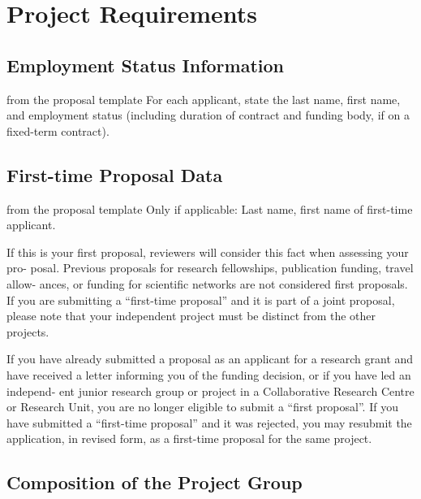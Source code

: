 \section{Project Requirements}\label{sec:requirements}

\subsection{Employment Status Information}\label{sec:req:employment-status}

\begin{todo}{from the proposal template}
  For each applicant, state the last name, first name, and employment status (including
  duration of contract and funding body, if on a fixed-term contract).
\end{todo}

\subsection{First-time Proposal Data}\label{sec:req:first}

\begin{todo}{from the proposal template}
  Only if applicable: Last name, first name of first-time applicant.

  If this is your first proposal, reviewers will consider this fact when assessing your
  pro- posal. Previous proposals for research fellowships, publication funding, travel
  allow- ances, or funding for scientific networks are not considered first proposals. If
  you are submitting a “first-time proposal” and it is part of a joint proposal, please
  note that your independent project must be distinct from the other projects.

  If you have already submitted a proposal as an applicant for a research grant and have
  received a letter informing you of the funding decision, or if you have led an independ-
  ent junior research group or project in a Collaborative Research Centre or Research
  Unit, you are no longer eligible to submit a “first proposal”. If you have submitted a
  “first-time proposal” and it was rejected, you may resubmit the application, in revised
  form, as a first-time proposal for the same project.
\end{todo}

\subsection{Composition of the Project Group}\label{sec:req:group}

